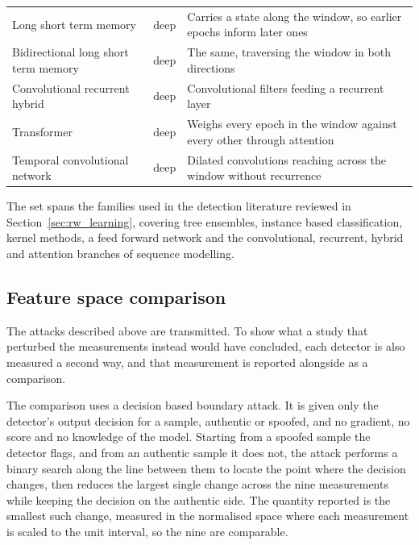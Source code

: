 \begin{table}[t]
\begin{tabular}{@{}p{3.6cm}lp{7.0cm}@{}}
Long short term memory & deep & Carries a state along the window, so earlier epochs
                                 inform later ones \citep{hochreiter1997long} \\
Bidirectional long short term memory & deep & The same, traversing the window in both
                                 directions \\
Convolutional recurrent hybrid & deep & Convolutional filters feeding a recurrent
                                 layer \\
Transformer        & deep & Weighs every epoch in the window against every other through
                                 attention \citep{vaswani2017attention} \\
Temporal convolutional network & deep & Dilated convolutions reaching across the window
                                 without recurrence \citep{bai2018empirical} \\
\bottomrule
\end{tabular}
\end{table}

The set spans the families used in the detection literature reviewed in
Section~\ref{sec:rw_learning}, covering tree ensembles, instance based classification,
kernel methods, a feed forward network and the convolutional, recurrent, hybrid and
attention branches of sequence modelling.

\subsection{Feature space comparison}
\label{sec:comparison}

The attacks described above are transmitted. To show what a study that perturbed the
measurements instead would have concluded, each detector is also measured a second way,
and that measurement is reported alongside as a comparison.

The comparison uses a decision based boundary attack. It is given only the detector's
output decision for a sample, authentic or spoofed, and no gradient, no score and no
knowledge of the model. Starting from a spoofed sample the detector flags, and from an
authentic sample it does not, the attack performs a binary search along the line between
them to locate the point where the decision changes, then reduces the largest single
change across the nine measurements while keeping the decision on the authentic side.
The quantity reported is the smallest such change, measured in the normalised space where
each measurement is scaled to the unit interval, so the nine are comparable.


